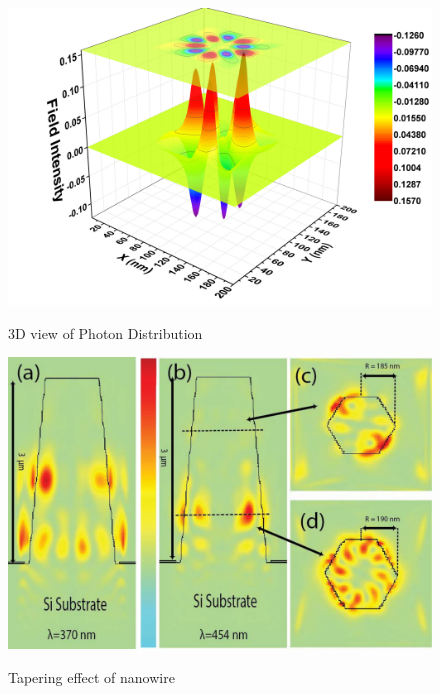 \begin{figure}
  \caption{3D view of Photon Distribution}
  \centering
  \includegraphics[width=\textwidth]{pictures/LM/photondensity2}
  \label{photondensity2}
\end{figure}

\begin{figure}
  \caption{Tapering effect of nanowire}
  \centering
  \includegraphics[width=\textwidth]{pictures/LM/Tapering}
  \label{Tapering}
\end{figure}




